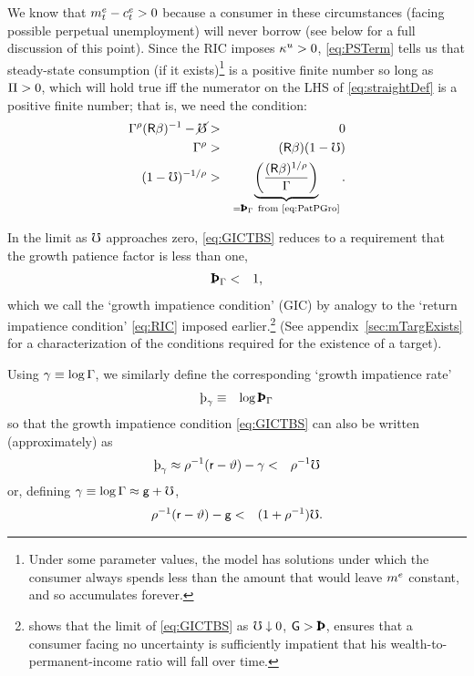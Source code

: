 \message{ !name(TractableBufferStock.tex)}\documentclass{handout}
\begin{document}
We know that $m^{e}_{t}-c^{e}_{t} > 0$ because a consumer in these
circumstances (facing possible perpetual unemployment) will never
borrow (see below for a full discussion of this point). 
Since the RIC imposes $\kappa^{u}>0$, \eqref{eq:PSTerm} tells
us that steady-state consumption (if it exists)\footnote{Under some parameter values, the model has solutions under which the consumer always spends less than the amount that would leave $m^{e}$ constant, and so accumulates forever.} is a positive finite number so long as $\Pi > 0$, which will hold true iff the numerator on the LHS of
\eqref{eq:straightDef} is a positive finite number; that is, we need the
condition:
\begin{eqnarray}
        \PGro^{\CRRA}(\Rfree\Discount)^{-1}-\erate & > & 0  \\
       \PGro^{\CRRA} & > & (\Rfree \Discount)(1-\urate)
\\     (1-\urate)^{-1/\CRRA} & > & \underbrace{\left(\frac{(\Rfree \Discount)^{1/\CRRA}}{\PGro}\right)}_{=\PatPGro~\text{from \eqref{eq:PatPGro}}}  \label{eq:GICTBS}.
\end{eqnarray}

In the limit as $\mho$ approaches zero, \eqref{eq:GICTBS} reduces to a requirement that the growth patience factor is less than one,
\begin{eqnarray}
  \PatPGro & < & 1 \label{eq:GIC}
,\end{eqnarray}
which we call the `growth impatience condition' (GIC) by analogy to the `return impatience condition' \eqref{eq:RIC} imposed earlier.\footnote{ shows that the limit of \eqref{eq:GICTBS} as $\mho \downarrow 0$, $\WGro > \Pat$, ensures that a consumer facing no uncertainty is sufficiently impatient that his wealth-to-permanent-income ratio will fall over time.}  (See appendix~\ref{sec:mTargExists} for a characterization of the conditions required for the existence of a target).

Using $\gamma \equiv \log \Gamma$, we similarly define the corresponding `growth impatience rate'
\begin{eqnarray}
  \patpGro & \equiv & \log \PatPGro
\end{eqnarray}
so that the growth impatience condition \eqref{eq:GICTBS} can also be written (approximately) as
\begin{eqnarray}
  \patpGro \approx \CRRA^{-1}(\rfree-\timeRate)-\pGro & < & \CRRA^{-1} \urate  \label{eq:GICrateUsingpGro}
\end{eqnarray}
or, defining $\gamma \equiv \log \Gamma \approx \mathsf{g}+\mho$, 
\begin{eqnarray}
 \rho^{-1}(\mathsf{r}-\vartheta)-\mathsf{g} & < & (1+\rho^{-1}) \mho \label{eq:GICrateUsingwGro}
.
\end{eqnarray}
\end{document}
